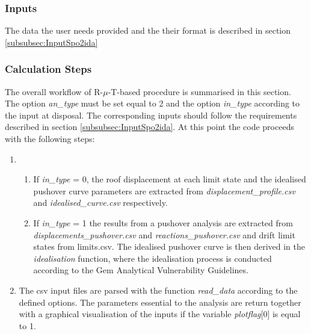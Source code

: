 {\subsubsection{Inputs}
The data the user needs provided and the their format is described in section \ref{subsubsec:InputSpo2ida}

\subsubsection{Calculation Steps} 
The overall workflow of R-$\mu$-T-based procedure is summarised in this section. The option \textit{an\_type} must be set equal to 2 and the option \textit{in\_type} according to the input at disposal. The corresponding inputs should follow the requirements described in section \ref{subsubsec:InputSpo2ida}. At this point the code proceeds with the following steps:

\begin{enumerate}
\item 
\begin{enumerate}
\item If \textit{in\_type} = 0, the roof displacement at each limit state and the idealised pushover curve parameters are extracted from \textit{displacement\_profile.csv} and \textit{idealised\_curve.csv} respectively.

\item If \textit{in\_type} = 1 the results from a pushover analysis are extracted from \textit{displacements\_pushover.csv} and \textit{reactions\_pushover.csv} and drift limit states from {limits.csv}. The idealised pushover curve is then derived in the \textit{idealisation} function, where the idealisation process is conducted according to the Gem Analytical Vulnerability Guidelines.	\end{enumerate}

\item The csv input files are parsed with the function \textit{read\_data} according to the defined options. The parameters essential to the analysis are return together with a graphical visualisation of the inputs if the variable \textit{plotflag}[0] is equal to 1.


\end{enumerate}}
